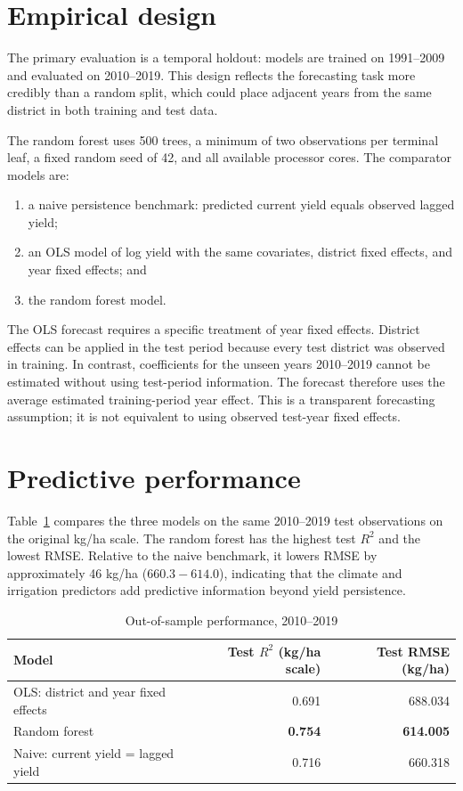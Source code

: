 \documentclass[11pt]{article}
\begin{document}
\section{Empirical design}

The primary evaluation is a temporal holdout: models are trained on 1991--2009 and evaluated on 2010--2019. This design reflects the forecasting task more credibly than a random split, which could place adjacent years from the same district in both training and test data.

The random forest uses 500 trees, a minimum of two observations per terminal leaf, a fixed random seed of 42, and all available processor cores. The comparator models are:

\begin{enumerate}
    \item a naive persistence benchmark: predicted current yield equals observed lagged yield;
    \item an OLS model of log yield with the same covariates, district fixed effects, and year fixed effects; and
    \item the random forest model.
\end{enumerate}

The OLS forecast requires a specific treatment of year fixed effects. District effects can be applied in the test period because every test district was observed in training. In contrast, coefficients for the unseen years 2010--2019 cannot be estimated without using test-period information. The forecast therefore uses the average estimated training-period year effect. This is a transparent forecasting assumption; it is not equivalent to using observed test-year fixed effects.

\section{Predictive performance}

Table~\ref{tab:performance} compares the three models on the same 2010--2019 test observations on the original kg/ha scale. The random forest has the highest test $R^2$ and the lowest RMSE. Relative to the naive benchmark, it lowers RMSE by approximately 46 kg/ha ($660.3 - 614.0$), indicating that the climate and irrigation predictors add predictive information beyond yield persistence.

\begin{table}[H]
\centering
\caption{Out-of-sample performance, 2010--2019}
\label{tab:performance}
\begin{tabular}{lrr}
\toprule
Model & Test $R^2$ (kg/ha scale) & Test RMSE (kg/ha) \\
\midrule
OLS: district and year fixed effects & 0.691 & 688.034 \\
Random forest & \textbf{0.754} & \textbf{614.005} \\
Naive: current yield = lagged yield & 0.716 & 660.318 \\
\bottomrule
\end{tabular}
\end{table}
\end{document}
